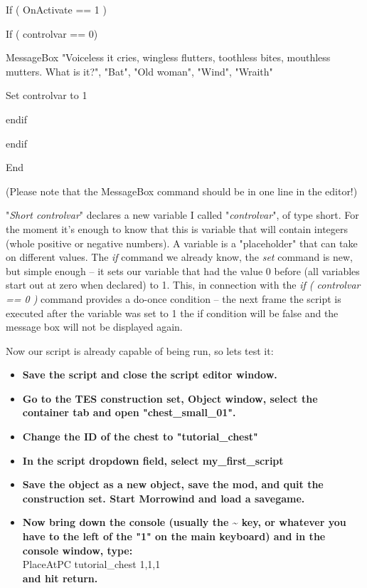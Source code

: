 \documentclass[
]{article}
\begin{document}
If ( OnActivate == 1 )

If ( controlvar == 0)

MessageBox "Voiceless it cries, wingless flutters, toothless bites,
mouthless mutters. What is it?", "Bat", "Old woman", "Wind", "Wraith"

Set controlvar to 1

endif

endif

End

(Please note that the MessageBox command should be in one line in the
editor!)

"\emph{Short controlvar}" declares a new variable I called
"\emph{controlvar}", of type short. For the moment it's enough to know
that this is variable that will contain integers (whole positive or
negative numbers). A variable is a "placeholder" that can take on
different values. The \emph{if} command we already know, the \emph{set}
command is new, but simple enough -- it sets our variable that had the
value 0 before (all variables start out at zero when declared) to 1.
This, in connection with the \emph{if ( controlvar == 0 )} command
provides a do-once condition -- the next frame the script is executed
after the variable was set to 1 the if condition will be false and the
message box will not be displayed again.

Now our script is already capable of being run, so lets test it:

\begin{itemize}
\item
  \textbf{Save the script and close the script editor window.}
\item
  \textbf{Go to the TES construction set, Object window, select the
  container tab and open "chest\_small\_01".}
\item
  \textbf{Change the ID of the chest to "tutorial\_chest"}
\item
  \textbf{In the script dropdown field, select my\_first\_script}
\item
  \textbf{Save the object as a new object, save the mod, and quit the
  construction set. Start Morrowind and load a savegame.}
\item
  \textbf{Now bring down the console (usually the \textasciitilde{} key,
  or whatever you have to the left of the "1" on the main keyboard) and
  in the console window, type:}\\
  PlaceAtPC tutorial\_chest 1,1,1\\
  \textbf{and hit return.}
\end{itemize}
\end{document}
